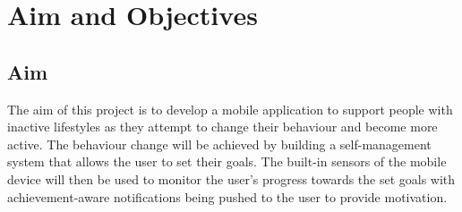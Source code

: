     
    \section{Aim and Objectives}
    
    \subsection*{Aim}
    The aim of this project is to develop a mobile application to support people with inactive lifestyles as they attempt to change their behaviour and become more active. The behaviour change will be achieved by building a self-management system that allows the user to set their goals. The built-in sensors of the mobile device will then be used to monitor the user's progress towards the set goals with achievement-aware notifications being pushed to the user to provide motivation.
    
